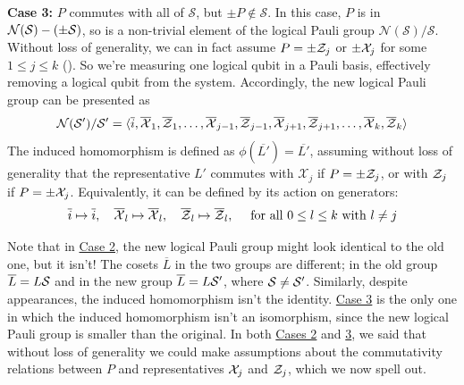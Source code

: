 \begin{theorem}
    \textbf{Case 3:}\label{thm:logical_pauli_group_update_measurement:case3} $P$ commutes with all of $\mathcal{S}$, but $\pm P \notin \mathcal{S}$.
    In this case, $P$ is in $\mathcal{N}(\mathcal{S}) - (\pm \mathcal{S})$, so is a non-trivial element of the logical Pauli group $\mathcal{N}(\mathcal{S})/\mathcal{S}$.
    Without loss of generality, we can in fact assume $P = \pm \mathcal{Z}_j$ or $\pm \mathcal{X}_j$ for some $1 \leq j \leq k$ ().
    So we're measuring one logical qubit in a Pauli basis, effectively removing a logical qubit from the system.
    Accordingly, the new logical Pauli group can be presented as
    \begin{equation}
        \mathcal{N}(\mathcal{S}')/\mathcal{S}' = \langle \overline{i}, \overline{\mathcal{X}}_1, \overline{\mathcal{Z}}_1, \ldots, \overline{\mathcal{X}}_{j-1}, \overline{\mathcal{Z}}_{j-1}, \overline{\mathcal{X}}_{j+1}, \overline{\mathcal{Z}}_{j+1}, \ldots, \overline{\mathcal{X}}_{k}, \overline{\mathcal{Z}}_{k} \rangle
    \end{equation}
    The induced homomorphism is defined as $\phi(\overline{L'}) = \overline{L'}$, assuming without loss of generality that the representative $L'$ commutes with $\mathcal{X}_j$ if $P = \pm \mathcal{Z}_j$, or with $\mathcal{Z}_j$ if $P = \pm \mathcal{X}_j$.
    Equivalently, it can be defined by its action on generators:
    \begin{equation}\label{eq:case_3_phi_definition_generators}
        \overline{i} \mapsto \overline{i}, \quad
        \overline{\mathcal{X}}_l \mapsto \overline{\mathcal{X}}_l, \quad
        \overline{\mathcal{Z}}_l \mapsto \overline{\mathcal{Z}}_l, \quad
        \text { for all $0 \leq l \leq k$ with $l \neq j$}
    \end{equation}
\end{theorem}

Note that in \hyperref[thm:logical_pauli_group_update_measurement:case2]{Case 2}, the new logical Pauli group might look identical to the old one, but it isn't!
The cosets $\overline{L}$ in the two groups are different; in the old group $\overline{L} = L\mathcal{S}$ and in the new group $\overline{L} = L\mathcal{S}'$, where $\mathcal{S} \neq \mathcal{S}'$.
Similarly, despite appearances, the induced homomorphism isn't the identity.
\hyperref[thm:logical_pauli_group_update_measurement:case3]{Case 3} is the only one in which the induced homomorphism isn't an isomorphism, since the new logical Pauli group is smaller than the original.
In both \hyperref[thm:logical_pauli_group_update_measurement:case2]{Cases 2} and \hyperref[thm:logical_pauli_group_update_measurement:case3]{3}, we said that without loss of generality we could make assumptions about the commutativity relations between $P$ and representatives $\mathcal{X}_j$ and $\mathcal{Z}_j$, which we now spell out.

